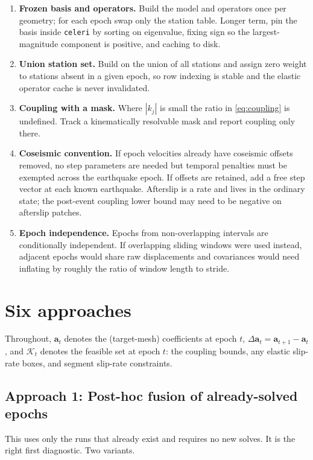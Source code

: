 \documentclass[11pt]{article}
\newcommand{\vect}[1]{\bm{#1}}
\newcommand{\code}[1]{\texttt{#1}}
\begin{document}
\begin{enumerate}[nosep]
\item \textbf{Frozen basis and operators.} Build the model and operators once per geometry; for each epoch swap only the station table. Longer term, pin the basis inside \code{celeri} by sorting on eigenvalue, fixing sign so the largest-magnitude component is positive, and caching to disk.
\item \textbf{Union station set.} Build on the union of all stations and assign zero weight to stations absent in a given epoch, so row indexing is stable and the elastic operator cache is never invalidated.
\item \textbf{Coupling with a mask.} Where $|k_j|$ is small the ratio in \eqref{eq:coupling} is undefined. Track a kinematically resolvable mask and report coupling only there.
\item \textbf{Coseismic convention.} If epoch velocities already have coseismic offsets removed, no step parameters are needed but temporal penalties must be exempted across the earthquake epoch. If offsets are retained, add a free step vector at each known earthquake. Afterslip is a rate and lives in the ordinary state; the post-event coupling lower bound may need to be negative on afterslip patches.
\item \textbf{Epoch independence.} Epochs from non-overlapping intervals are conditionally independent. If overlapping sliding windows were used instead, adjacent epochs would share raw displacements and covariances would need inflating by roughly the ratio of window length to stride.
\end{enumerate}

\section{Six approaches}

Throughout, $\vect{a}_t$ denotes the (target-mesh) coefficients at epoch $t$, $\Delta\vect{a}_t = \vect{a}_{t+1} - \vect{a}_t$, and $\mathcal{K}_t$ denotes the feasible set at epoch $t$: the coupling bounds, any elastic slip-rate boxes, and segment slip-rate constraints.

\subsection{Approach 1: Post-hoc fusion of already-solved epochs}

This uses only the runs that already exist and requires no new solves. It is the right first diagnostic. Two variants.
\end{document}
